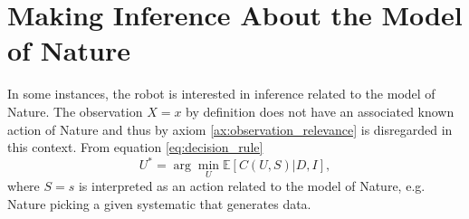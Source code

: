 	\section{Making Inference About the Model of Nature}
	In some instances, the robot is interested in inference related to the model of Nature. The observation $X=x$ by definition does not have an associated known action of Nature and thus by axiom \ref{ax:observation_relevance} is disregarded in this context. From equation \eqref{eq:decision_rule}
	\begin{equation}
		U^*=\arg\min_U\mathbb{E}[C(U, S)|D,I],
		\label{eq:best_decision}
	\end{equation}
	where $S=s$ is interpreted as an action related to the model of Nature, e.g. Nature picking a given systematic that generates data.
	
